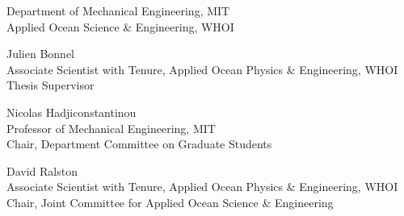 \begin{titlepage}
\begin{center}
\begin{singlespace}
    \signature{Author}{\small Department of Mechanical Engineering, MIT \\ Applied Ocean Science \& Engineering, WHOI \\ \@date}
    \vspace{1em}
    \signature{Certified by}{Julien Bonnel \\ \small Associate Scientist with Tenure, Applied Ocean Physics \& Engineering, WHOI \\ Thesis Supervisor}
    \vspace{1em}
    \signature{Accepted by}{Nicolas Hadjiconstantinou \\ \small Professor of Mechanical Engineering, MIT \\ Chair, Department Committee on Graduate Students}
    \vspace{1em}
    \signature{Accepted by}{David Ralston \\ \small Associate Scientist with Tenure, Applied Ocean Physics \& Engineering, WHOI \\ Chair, Joint Committee for Applied Ocean Science \& Engineering}
    \end{singlespace}
  \end{center}
  \makeatother
\end{titlepage}

\newpage
\null
\newpage